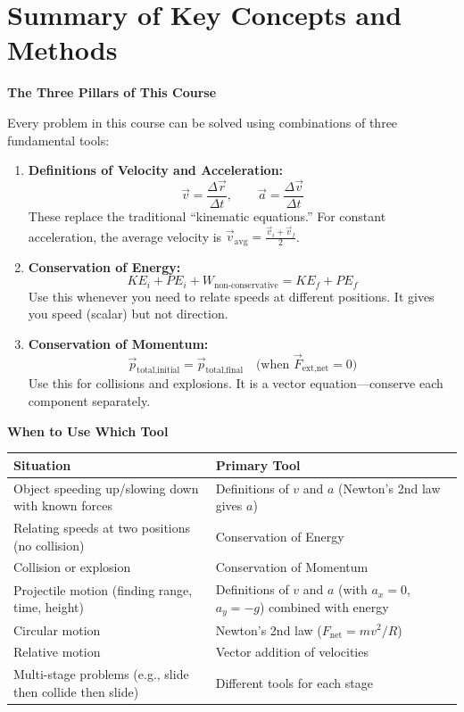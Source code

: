 \documentclass[12pt,letterpaper]{article}
\begin{document}
\newpage
\section*{Summary of Key Concepts and Methods}

\begin{conceptbox}
\textbf{The Three Pillars of This Course}

Every problem in this course can be solved using combinations of three fundamental tools:

\begin{enumerate}[label=\textbf{\arabic*.}]
    \item \textbf{Definitions of Velocity and Acceleration:}
    \[
    \vec{v} = \frac{\Delta \vec{r}}{\Delta t}, \qquad \vec{a} = \frac{\Delta \vec{v}}{\Delta t}
    \]
    These replace the traditional ``kinematic equations.'' For constant acceleration, the average velocity is $\vec{v}_{\text{avg}} = \frac{\vec{v}_i + \vec{v}_f}{2}$.
    
    \item \textbf{Conservation of Energy:}
    \[
    KE_i + PE_i + W_{\text{non-conservative}} = KE_f + PE_f
    \]
    Use this whenever you need to relate speeds at different positions. It gives you speed (scalar) but not direction.
    
    \item \textbf{Conservation of Momentum:}
    \[
    \vec{p}_{\text{total,initial}} = \vec{p}_{\text{total,final}} \quad \text{(when } \vec{F}_{\text{ext,net}} = 0\text{)}
    \]
    Use this for collisions and explosions. It is a vector equation---conserve each component separately.
\end{enumerate}
\end{conceptbox}

\begin{conceptbox}
\textbf{When to Use Which Tool}

\begin{center}
\begin{tabular}{>{\raggedright\arraybackslash}p{5cm} >{\raggedright\arraybackslash}p{8cm}}
\toprule
\textbf{Situation} & \textbf{Primary Tool} \\
\midrule
Object speeding up/slowing down with known forces & Definitions of $v$ and $a$ (Newton's 2nd law gives $a$) \\
\midrule
Relating speeds at two positions (no collision) & Conservation of Energy \\
\midrule
Collision or explosion & Conservation of Momentum \\
\midrule
Projectile motion (finding range, time, height) & Definitions of $v$ and $a$ (with $a_x = 0$, $a_y = -g$) combined with energy \\
\midrule
Circular motion & Newton's 2nd law ($F_{\text{net}} = mv^2/R$) \\
\midrule
Relative motion & Vector addition of velocities \\
\midrule
Multi-stage problems (e.g., slide then collide then slide) & Different tools for each stage \\
\bottomrule
\end{tabular}
\end{center}
\end{conceptbox}
\end{document}
